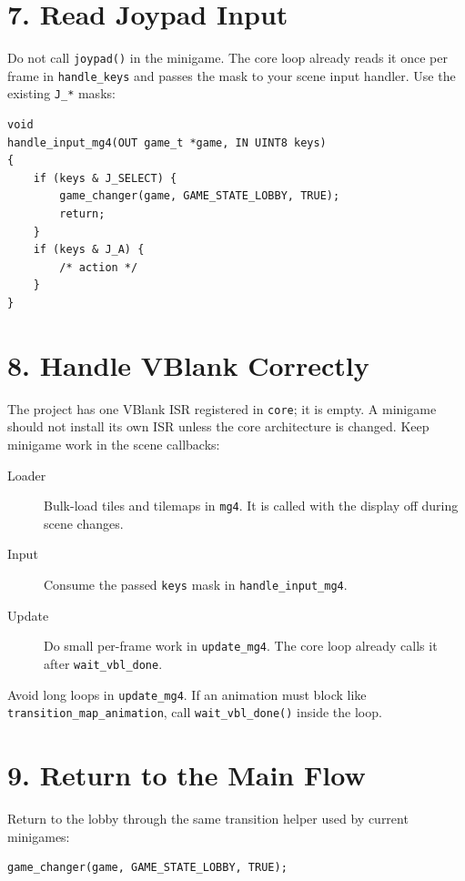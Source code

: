 \section{7. Read Joypad Input}

Do not call \texttt{joypad()} in the minigame. The core loop already reads it once per frame in \texttt{handle\_keys} and passes the mask to your scene input handler. Use the existing \texttt{J\_*} masks:

\begin{lstlisting}[caption={Input handler pattern}]
void
handle_input_mg4(OUT game_t *game, IN UINT8 keys)
{
    if (keys & J_SELECT) {
        game_changer(game, GAME_STATE_LOBBY, TRUE);
        return;
    }
    if (keys & J_A) {
        /* action */
    }
}
\end{lstlisting}

\section{8. Handle VBlank Correctly}

The project has one VBlank ISR registered in \texttt{core}; it is empty. A minigame should not install its own ISR unless the core architecture is changed. Keep minigame work in the scene callbacks:

\begin{description}
  \item[Loader] Bulk-load tiles and tilemaps in \texttt{mg4}. It is called with the display off during scene changes.
  \item[Input] Consume the passed \texttt{keys} mask in \texttt{handle\_input\_mg4}.
  \item[Update] Do small per-frame work in \texttt{update\_mg4}. The core loop already calls it after \texttt{wait\_vbl\_done}.
\end{description}

Avoid long loops in \texttt{update\_mg4}. If an animation must block like \texttt{transition\_map\_animation}, call \texttt{wait\_vbl\_done()} inside the loop.

\section{9. Return to the Main Flow}

Return to the lobby through the same transition helper used by current minigames:

\begin{lstlisting}[caption={Return to lobby}]
game_changer(game, GAME_STATE_LOBBY, TRUE);
\end{lstlisting}

